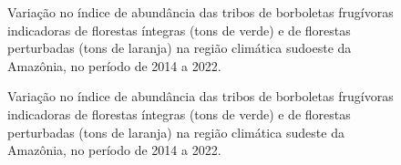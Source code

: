 \documentclass[
  letterpaper,
]{scrbook}
\begin{document}
\begin{figure}[H]


\caption{\label{fig-IA-areas-abertas-regiao-climatica-sudoeste-amazonica}Variação
no índice de abundância das tribos de borboletas frugívoras indicadoras
de florestas íntegras (tons de verde) e de florestas perturbadas (tons
de laranja) na região climática sudoeste da Amazônia, no período de 2014
a 2022.}

\end{figure}%

\begin{figure}[H]


\caption{\label{fig-IA-regiao-climatica-sudeste-amazonica}Variação no
índice de abundância das tribos de borboletas frugívoras indicadoras de
florestas íntegras (tons de verde) e de florestas perturbadas (tons de
laranja) na região climática sudeste da Amazônia, no período de 2014 a
2022.}

\end{figure}%
\end{document}
